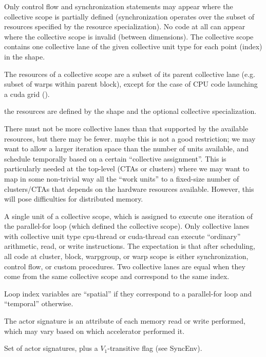 \filbreak
Only control flow and synchronization statements may appear where the collective scope is partially defined (synchronization operates over the subset of resources specified by the resource specialization).
No code at all can appear where the collective scope is invalid (between dimensions).
The collective scope contains one collective lane of the given collective unit type for each point (index) in the shape.

The resources of a collective scope are a subset of its parent collective lane (e.g. subset of warps within parent block), except for the case of CPU code launching a cuda grid ().

the resources are defined by the shape and the optional collective specialization.

There must not be more collective lanes than that supported by the available resources, but there may be fewer.
 maybe this is not a good restriction; we may want to allow a larger iteration space than the number of units available, and schedule temporally based on a certain ``collective assignment''.
This is particularly needed at the top-level (CTAs or clusters) where we may want to map in some non-trivial way all the ``work units'' to a fixed-size number of clusters/CTAs that depends on the hardware resources available.
However, this will pose difficulties for distributed memory.

\filbreak
{} A single unit of a collective scope, which is assigned to execute one iteration of the parallel-for loop (which defined the collective scope).
Only collective lanes with collective unit type cpu-thread or cuda-thread can execute ``ordinary'' arithmetic, read, or write instructions.
The expectation is that after scheduling, all code at cluster, block, warpgroup, or warp scope is either synchronization, control flow, or custom procedures.
Two collective lanes are equal when they come from the same collective scope and correspond to the same index.

\filbreak
{} Loop index variables are ``spatial'' if they correspond to a parallel-for loop and ``temporal'' otherwise.

\filbreak
{}
The actor signature is an attribute of each memory read or write performed, which may vary based on which accelerator performed it.

\filbreak
{}
Set of actor signatures, plus a $V_1$-transitive flag (see SyncEnv).

